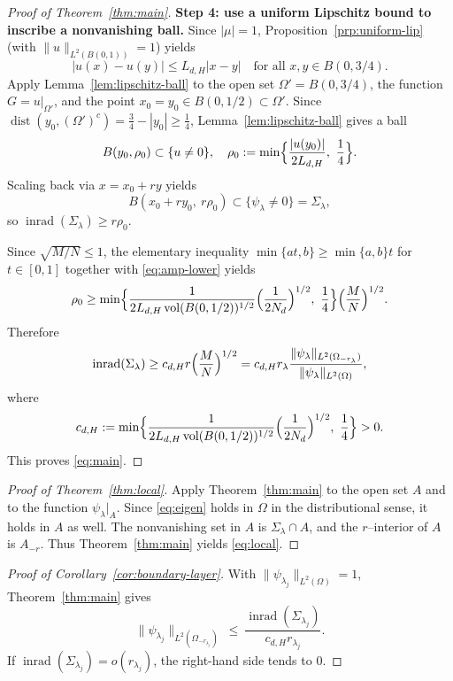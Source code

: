 \documentclass[12pt, reqno]{amsart}
\theoremstyle{plain}
\theoremstyle{remark}
\newcommand{\vol}{\operatorname{vol}}
\newcommand{\inrad}{\operatorname{inrad}}
\newcommand{\dist}{\operatorname{dist}}
\begin{document}
\begin{proof}[Proof of Theorem~\ref{thm:main}]
\textbf{Step 4: use a uniform Lipschitz bound to inscribe a nonvanishing ball.}
Since $|\mu| = 1$, Proposition~\ref{prp:uniform-lip} (with $\|u\|_{L^2(B(0,1))} = 1$) yields
$$
|u(x)-u(y)|\le L_{d,H}|x-y|\quad\text{for all }x,y\in B(0,3/4).
$$
Apply Lemma~\ref{lem:lipschitz-ball} to the open set $\Omega' = B(0,3/4)$, the function $G = u|_{\Omega'}$, and the point $x_0 = y_0\in B(0,1/2)\subset\Omega'$.
Since $\dist(y_0,(\Omega')^c) = \frac34-|y_0|\ge \frac14$, Lemma~\ref{lem:lipschitz-ball} gives a ball
$$
B(y_0,\rho_0)\subset\{u\neq 0\},
\quad
\rho_0 := \min\Bigl\{\frac{|u(y_0)|}{2L_{d,H}},\ \frac14\Bigr\}.
$$
Scaling back via $x = x_0+r y$ yields
$$
B(x_0+r y_0,\ r\rho_0)\subset\{\psi_\lambda\neq 0\} = \Sigma_\lambda,
$$
so $\inrad(\Sigma_\lambda)\ge r\rho_0$.

Since $\sqrt{M/N}\le 1$, the elementary inequality $\min\{a t,b\}\ge \min\{a,b\} t$ for $t\in[0,1]$
together with \eqref{eq:amp-lower} yields
$$
\rho_0
\ge
\min\Bigl\{
\frac{1}{2L_{d,H} \vol(B(0,1/2))^{1/2}}\Bigl(\frac{1}{2N_d}\Bigr)^{1/2},
\ \frac14
\Bigr\} \Bigl(\frac{M}{N}\Bigr)^{1/2}.
$$
Therefore
$$
\inrad(\Sigma_\lambda)
\ge
c_{d,H} r \Bigl(\frac{M}{N}\Bigr)^{1/2}
 = 
c_{d,H} r_\lambda 
\frac{\|\psi_\lambda\|_{L^2(\Omega_{-r_\lambda})}}{\|\psi_\lambda\|_{L^2(\Omega)}},
$$
where
$$
c_{d,H} := 
\min\Bigl\{
\frac{1}{2L_{d,H} \vol(B(0,1/2))^{1/2}}\Bigl(\frac{1}{2N_d}\Bigr)^{1/2},
\ \frac14
\Bigr\}>0.
$$
This proves \eqref{eq:main}.
\end{proof}

\begin{proof}[Proof of Theorem~\ref{thm:local}]
Apply Theorem~\ref{thm:main} to the open set $A$ and to the function $\psi_\lambda|_A$.
Since \eqref{eq:eigen} holds in $\Omega$ in the distributional sense, it holds in $A$ as well.
The nonvanishing set in $A$ is $\Sigma_\lambda\cap A$, and the $r$--interior of $A$ is $A_{-r}$.
Thus Theorem~\ref{thm:main} yields \eqref{eq:local}.
\end{proof}

\begin{proof}[Proof of Corollary~\ref{cor:boundary-layer}]
With $\|\psi_{\lambda_j}\|_{L^2(\Omega)} = 1$, Theorem~\ref{thm:main} gives
$$
\|\psi_{\lambda_j}\|_{L^2(\Omega_{-r_{\lambda_j}})}
\ \le\ \frac{\inrad(\Sigma_{\lambda_j})}{c_{d,H} r_{\lambda_j}}.
$$
If $\inrad(\Sigma_{\lambda_j}) = o(r_{\lambda_j})$, the right-hand side tends to $0$.
\end{proof}
\end{document}
